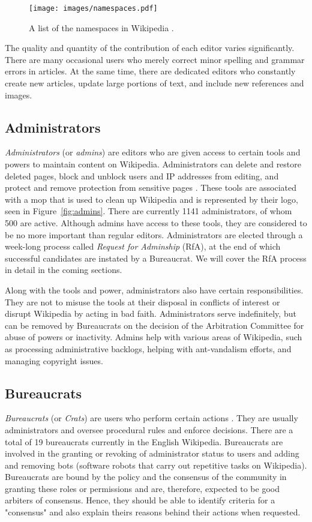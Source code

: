 \begin{figure}[htp]
    \centering
    \texttt{[image: images/namespaces.pdf]}
    \caption{A list of the namespaces in Wikipedia \cite{wiki:namespace}.}
    \label{fig:namespace}
\end{figure}

The quality and quantity of the contribution of each editor varies significantly.
There are many occasional users who merely correct minor spelling and grammar errors in articles.
At the same time, there are dedicated editors who constantly create new articles, update large portions of text, and include new references and images.   

\subsection{Administrators}
\textit{Administrators} (or \textit{admins}) are editors who are given access to certain tools and powers to maintain content on Wikipedia.
Administrators can delete and restore deleted pages, block and unblock users and IP addresses from editing, and protect and remove protection from sensitive pages \cite{wiki:admins}.
These tools are associated with a mop that is used to clean up Wikipedia and is represented by their logo, seen in Figure~\ref{fig:admins}. 
There are currently 1141 administrators, of whom 500 are active.
Although admins have access to these tools, they are considered to be no more important than regular editors.
Administrators are elected through a week-long process called \textit{Request for Adminship} (RfA), at the end of which successful candidates are instated by a Bureaucrat.
We will cover the RfA process in detail in the coming sections. 

Along with the tools and power, administrators also have certain responsibilities.
They are not to misuse the tools at their disposal in conflicts of interest or disrupt Wikipedia by acting in bad faith.
Administrators serve indefinitely, but can be removed  by Bureaucrats on the decision of the Arbitration Committee for abuse of powers or inactivity.
Admins help with various areas of Wikipedia, such as processing administrative backlogs, helping with ant-vandalism efforts, and managing copyright issues. 

\subsection{Bureaucrats}
\textit{Bureaucrats} (or \textit{Crats}) are users who perform certain actions \cite{wiki:bureaucrats}.
They are usually administrators and oversee procedural rules and enforce decisions.
There are a total of 19 bureaucrats currently in the English Wikipedia.
Bureaucrats are involved in the granting or revoking of administrator status to users and adding and removing bots (software robots that carry out repetitive tasks on Wikipedia).
Bureaucrats are bound by the policy and the consensus of the community in granting these roles or permissions and are, therefore, expected to be good arbiters of consensus.
Hence, they should be able to identify criteria for a "consensus" and also explain theirs reasons behind their actions when requested. 

